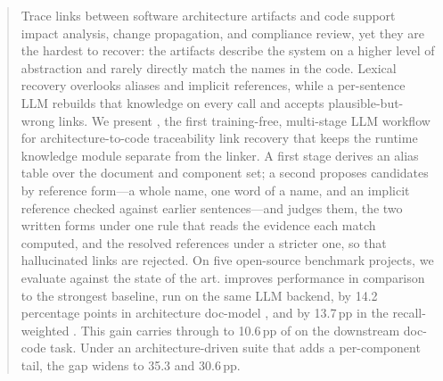 \documentclass[acmsmall,screen,review,anonymous]{acmart}
\newcounter{prompt}
\begin{document}
\begin{abstract}
Trace links between software architecture artifacts and code support impact analysis, change propagation, and compliance review, yet they are the hardest to recover: the artifacts describe the system on a higher level of abstraction and rarely directly match the names in the code.
Lexical recovery overlooks aliases and implicit references, while a per-sentence \ac{LLM} rebuilds that knowledge on every call and accepts plausible-but-wrong links.
We present \approach, the first training-free, multi-stage \ac{LLM} workflow for architecture-to-code traceability link recovery that keeps the runtime knowledge module separate from the linker.
A first stage derives an alias table over the document and component set; a second proposes candidates by reference form---a whole name, one word of a name, and an implicit reference checked against earlier sentences---and judges them, the two written forms under one rule that reads the evidence each match computed, and the resolved references under a stricter one, so that hallucinated links are rejected.
On five open-source benchmark projects, we evaluate \approach against the state of the art. %
\approach improves performance in comparison to the strongest baseline, run on the same \ac{LLM} backend, by 14.2 percentage points in architecture doc-model \avgfone, and by 13.7\,pp in the recall-weighted \avgftwo.
This gain carries through to 10.6\,pp of \avgfone on the downstream doc-code task.
Under an architecture-driven suite that adds a per-component tail, the gap widens to 35.3 and 30.6\,pp.
\end{abstract}
\end{document}
